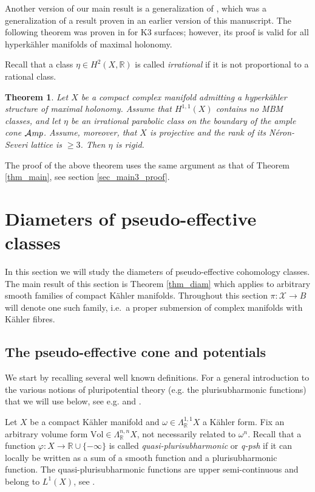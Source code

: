 \documentclass[11pt]{article}
\newcommand{\6}{\partial}
\newcommand{\R}{\mathbb{R}}
\newcommand{\bbR}{\mathbb{R}}
\newcommand{\XX}{\mathcal{X}}
\newcommand{\Amp}{{\mathcal{A}\it {mp}}}
\newcommand{\Vol}{\mathrm{Vol}}
\newtheorem{thm}[defn]{Theorem}
\begin{document}
Another version of our main result is a generalization
of \cite[Theorem 4.3.1]{_Filip_Tosatti:canonical_}, which
was a generalization of a result proven in an earlier
version of this manuscript. The following theorem
was proven in \cite{_Filip_Tosatti:canonical_}
for K3 surfaces; however, its proof is valid for 
all hyperk\"ahler manifolds of maximal holonomy.

Recall that a class $\eta \in H^2(X,\R)$
is called {\em irrational} if it is not proportional
to a rational class.

\begin{thm}\label{_main3_Theorem_}
Let $X$ be a compact complex manifold admitting a hyperk\"ahler
structure of maximal holonomy. Assume that $H^{1,1}(X)$
contains no MBM classes, and let $\eta$ be an irrational
parabolic class on the boundary of the ample cone $\Amp$.
Assume, moreover, that $X$ is projective and the
rank of its N\'eron-Severi lattice is $\geq 3$.
Then $\eta$ is rigid.
\end{thm} 


The proof of the above theorem uses the 
same argument as that of Theorem \ref{thm_main},
see section \ref{sec_main3_proof}.


\section{Diameters of pseudo-effective classes}\label{sec_diam}

In this section we will study the diameters of pseudo-effective cohomology classes.
The main result of this section is Theorem \ref{thm_diam} which applies to arbitrary
smooth families of compact K\"ahler manifolds. Throughout this section $\pi\colon \XX\to B$
will denote one such family, i.e.\ a proper submersion of complex manifolds with K\"ahler fibres.

\subsection{The pseudo-effective cone and potentials}

We start by recalling several well known definitions. For a general introduction to the
various notions of pluripotential theory (e.g. the plurisubharmonic functions) that we will use below,
see e.g. \cite{H1} and \cite{GZ}.

Let $X$ be a compact K\"ahler manifold and $\omega\in \Lambda^{1,1}_\bbR X$ a K\"ahler form.
Fix an arbitrary volume form $\Vol\in\Lambda^{n,n}_\bbR X$, not necessarily related to $\omega^n$.
Recall that a function $\varphi\colon X\to\bbR\cup\{-\infty\}$ is called {\em quasi-plurisubharmonic}
or {\em q-psh} if it can locally be written as a sum of a smooth function and
a plurisubharmonic function. The quasi-plurisubharmonic functions are upper semi-continuous
and belong to $L^1(X)$, see \cite{GZ}.  
\end{document}
